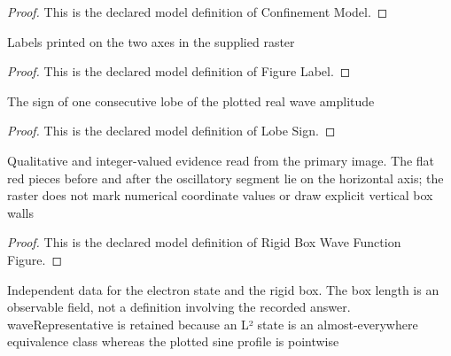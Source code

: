 \begin{proof}
  This is the declared model definition of Confinement Model.
\end{proof}
\begin{definition}
  \label{def:physics:phyx-mini-0508:phyxminiproblems-problemphyxmini0508-figurelabel}
  Labels printed on the two axes in the supplied raster
\end{definition}
\begin{proof}
  This is the declared model definition of Figure Label.
\end{proof}
\begin{definition}
  \label{def:physics:phyx-mini-0508:phyxminiproblems-problemphyxmini0508-lobesign}
  The sign of one consecutive lobe of the plotted real wave amplitude
\end{definition}
\begin{proof}
  This is the declared model definition of Lobe Sign.
\end{proof}
\begin{definition}
  \label{def:physics:phyx-mini-0508:phyxminiproblems-problemphyxmini0508-rigidboxwavefunctionfigure}
  Qualitative and integer-valued evidence read from the primary image. The flat red pieces before and after the oscillatory segment lie on the horizontal axis; the raster does not mark numerical coordinate values or draw explicit vertical box walls
\end{definition}
\begin{proof}
  This is the declared model definition of Rigid Box Wave Function Figure.
\end{proof}
\begin{definition}
  \label{def:physics:phyx-mini-0508:phyxminiproblems-problemphyxmini0508-rigidboxelectronsetup}
  Independent data for the electron state and the rigid box. The box length is an observable field, not a definition involving the recorded answer. waveRepresentative is retained because an L² state is an almost-everywhere equivalence class whereas the plotted sine profile is pointwise
\end{definition}
